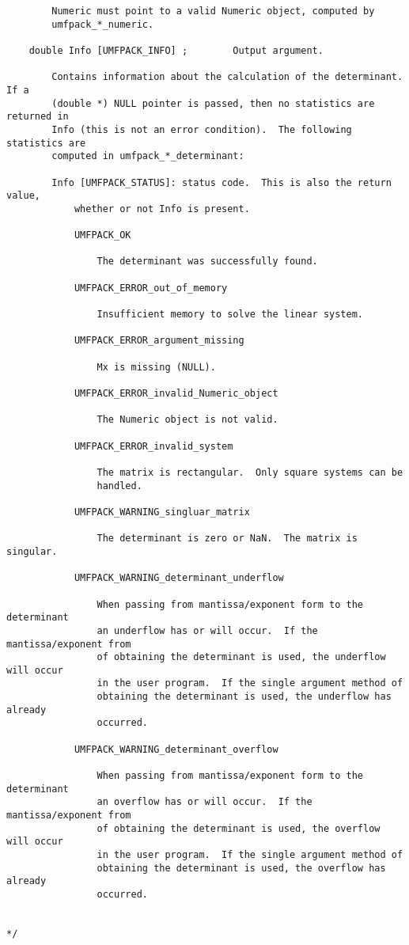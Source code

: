 \documentclass[11pt]{article}
\begin{document}
{\begin{verbatim}
        Numeric must point to a valid Numeric object, computed by
        umfpack_*_numeric.

    double Info [UMFPACK_INFO] ;        Output argument.

        Contains information about the calculation of the determinant. If a
        (double *) NULL pointer is passed, then no statistics are returned in
        Info (this is not an error condition).  The following statistics are
        computed in umfpack_*_determinant:

        Info [UMFPACK_STATUS]: status code.  This is also the return value,
            whether or not Info is present.

            UMFPACK_OK

                The determinant was successfully found.

            UMFPACK_ERROR_out_of_memory

                Insufficient memory to solve the linear system.

            UMFPACK_ERROR_argument_missing

                Mx is missing (NULL).

            UMFPACK_ERROR_invalid_Numeric_object

                The Numeric object is not valid.

            UMFPACK_ERROR_invalid_system

                The matrix is rectangular.  Only square systems can be
                handled.

            UMFPACK_WARNING_singluar_matrix

                The determinant is zero or NaN.  The matrix is singular.

            UMFPACK_WARNING_determinant_underflow

                When passing from mantissa/exponent form to the determinant
                an underflow has or will occur.  If the mantissa/exponent from
                of obtaining the determinant is used, the underflow will occur
                in the user program.  If the single argument method of
                obtaining the determinant is used, the underflow has already
                occurred.

            UMFPACK_WARNING_determinant_overflow

                When passing from mantissa/exponent form to the determinant
                an overflow has or will occur.  If the mantissa/exponent from
                of obtaining the determinant is used, the overflow will occur
                in the user program.  If the single argument method of
                obtaining the determinant is used, the overflow has already
                occurred.


*/
\end{verbatim}
}
\end{document}

